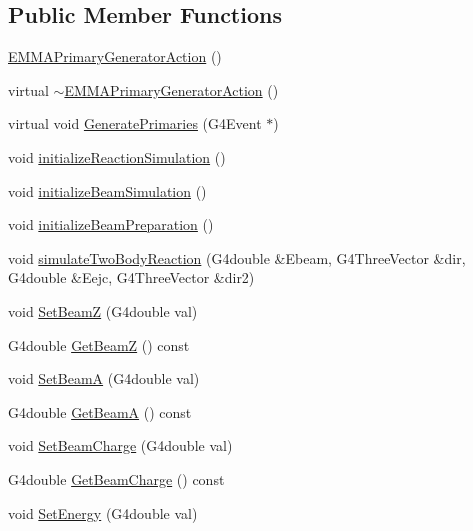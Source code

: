 \subsection*{Public Member Functions}
\begin{DoxyCompactItemize}
\item 
\hyperlink{classEMMAPrimaryGeneratorAction_ad5c3a0a72a5ba0569991f6e11880ece6}{E\+M\+M\+A\+Primary\+Generator\+Action} ()
\item 
virtual \hyperlink{classEMMAPrimaryGeneratorAction_a62a74df1fcb8ce3dcf11a2360ee5f2cd}{$\sim$\+E\+M\+M\+A\+Primary\+Generator\+Action} ()
\item 
virtual void \hyperlink{classEMMAPrimaryGeneratorAction_a494c4e386580292e35a7cb96a48b50ac}{Generate\+Primaries} (G4\+Event $\ast$)
\item 
void \hyperlink{classEMMAPrimaryGeneratorAction_a9e3503656a81f1978a84857e14d0d4cf}{initialize\+Reaction\+Simulation} ()
\item 
void \hyperlink{classEMMAPrimaryGeneratorAction_ae78623512eae25e20c9b7098fc47bfac}{initialize\+Beam\+Simulation} ()
\item 
void \hyperlink{classEMMAPrimaryGeneratorAction_a18d08425d20692d8ef11fadfeac15959}{initialize\+Beam\+Preparation} ()
\item 
void \hyperlink{classEMMAPrimaryGeneratorAction_a17ed29b853469bbd1452e4cb141a2af8}{simulate\+Two\+Body\+Reaction} (G4double \&Ebeam, G4\+Three\+Vector \&dir, G4double \&Eejc, G4\+Three\+Vector \&dir2)
\item 
void \hyperlink{classEMMAPrimaryGeneratorAction_a78c25e121ccb52c59a240f9b8bd93ca8}{Set\+BeamZ} (G4double val)
\item 
G4double \hyperlink{classEMMAPrimaryGeneratorAction_aeab65a4dda7039d62456b4f97de012b7}{Get\+BeamZ} () const 
\item 
void \hyperlink{classEMMAPrimaryGeneratorAction_ac8a549a7b2b615e5e05d8a0bcfa87f6d}{Set\+BeamA} (G4double val)
\item 
G4double \hyperlink{classEMMAPrimaryGeneratorAction_a7301de2f3d000aa119d325639d4b76b2}{Get\+BeamA} () const 
\item 
void \hyperlink{classEMMAPrimaryGeneratorAction_a8af88413b1bd1d4ac2a1df49ec1d394a}{Set\+Beam\+Charge} (G4double val)
\item 
G4double \hyperlink{classEMMAPrimaryGeneratorAction_af30f56f3915ea9a681ed679f7fc6894c}{Get\+Beam\+Charge} () const 
\item 
void \hyperlink{classEMMAPrimaryGeneratorAction_ac2af82919542c82663894b5ca620a672}{Set\+Energy} (G4double val)

\end{DoxyCompactItemize}
